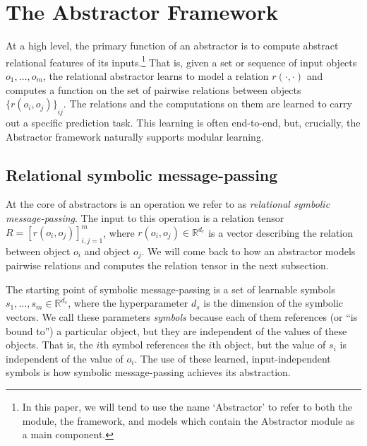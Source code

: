 
\def\m{m}


\section{The Abstractor Framework}
\label{sec:abstractor_framework}

At a high level, the primary function of an abstractor is to compute abstract relational features of its
inputs.\footnote{In this paper, we will tend to use the name `Abstractor' to refer to both the module, the framework, and models which contain the Abstractor module as a main component.} That is, given a set or sequence of input objects $o_1, \ldots, o_\m$, the relational abstractor learns to model a relation $r(\cdot, \cdot)$ and computes a function on
the set of pairwise relations between objects ${\{ r(o_i, o_j) \}}_{ij}$. The relations and the computations on them are learned to carry out a specific prediction task. This learning is often end-to-end, but, crucially, the Abstractor framework naturally supports modular learning.
\subsection{Relational symbolic message-passing}
\label{ssec:message_passing}

At the core of abstractors is an operation we refer to as \textit{relational symbolic message-passing}.
The input to this operation is a relation tensor $R = \left[r(o_i, o_j)\right]_{i,j=1}^\m$, where $r(o_i, o_j) \in \mathbb{R}^{d_r}$ is a vector describing the relation between object $o_i$ and object $o_j$. We will come back to how an abstractor models pairwise relations and computes the relation tensor in the next subsection.

The starting point of symbolic message-passing is a set of learnable symbols $s_1, \ldots, s_\m \in \mathbb{R}^{d_s}$, where the hyperparameter $d_s$ is the dimension of the symbolic vectors. We call these parameters \textit{symbols} because each of them references (or ``is bound to'') a particular object, but they are independent of the values of these objects. That is, the $i$th symbol references the $i$th object, but the value of $s_i$ is independent of the value of $o_i$. The use of these learned, input-independent symbols is how symbolic message-passing achieves its abstraction.

